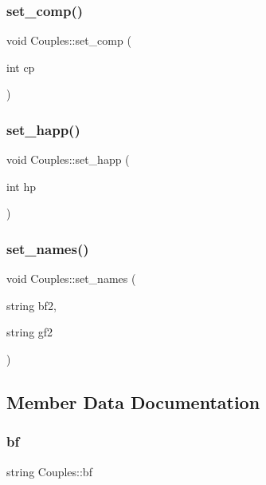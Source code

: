 \subsubsection{\texorpdfstring{set\+\_\+comp()}{set\_comp()}}
{\footnotesize\ttfamily void Couples\+::set\+\_\+comp (\begin{DoxyParamCaption}\item[{int}]{cp }\end{DoxyParamCaption})}

\mbox{\label{classCouples_a217f4f5bbe400c3f9e7560634338e872}} 
\subsubsection{\texorpdfstring{set\+\_\+happ()}{set\_happ()}}
{\footnotesize\ttfamily void Couples\+::set\+\_\+happ (\begin{DoxyParamCaption}\item[{int}]{hp }\end{DoxyParamCaption})}

\mbox{\label{classCouples_aed02f9e556158ecab7d77f541edd1644}} 
\subsubsection{\texorpdfstring{set\+\_\+names()}{set\_names()}}
{\footnotesize\ttfamily void Couples\+::set\+\_\+names (\begin{DoxyParamCaption}\item[{string}]{bf2,  }\item[{string}]{gf2 }\end{DoxyParamCaption})}



\subsection{Member Data Documentation}
\mbox{\label{classCouples_ab551e7b7c2eb3bdf8ddbdafc55209c31}} 
\subsubsection{\texorpdfstring{bf}{bf}}
{\footnotesize\ttfamily string Couples\+::bf\hspace{0.3cm}{\ttfamily [private]}}

